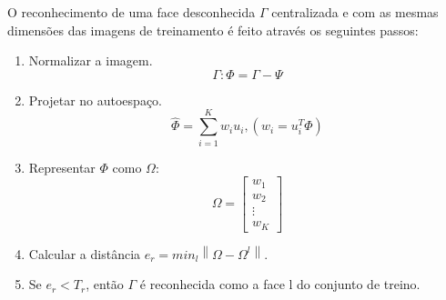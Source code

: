 O reconhecimento de uma face desconhecida $\Gamma$ centralizada e com as mesmas dimensões das imagens de treinamento é feito através os seguintes passos:

\begin{enumerate}
    \item Normalizar a imagem.
        \begin{equation} \label{eq:eign_rec_norm}
            \Gamma: \Phi = \Gamma - \Psi
        \end{equation}
    \item Projetar no autoespaço.
        \begin{equation} \label{eq:eign_rec_lincomb}
            \hat{\Phi} = \sum_{i=1}^{K}w_iu_i, (w_i = u_{i}^{T}\Phi)
        \end{equation}
    \item Representar $\Phi$ como $\Omega$:
        \begin{equation} \label{eq:eign_rec_omg}
            \Omega = \begin{bmatrix}
            w_{1}\\ 
            w_{2}\\ 
            \vdots\\ 
            w_{K}
            \end{bmatrix}
        \end{equation}
    \item Calcular a distância $e_r = min_l\left \| \Omega - \Omega^l \right \|$.
    \item Se $e_r < T_r$, então $\Gamma$ é reconhecida como a face l do conjunto de treino.
\end{enumerate}


